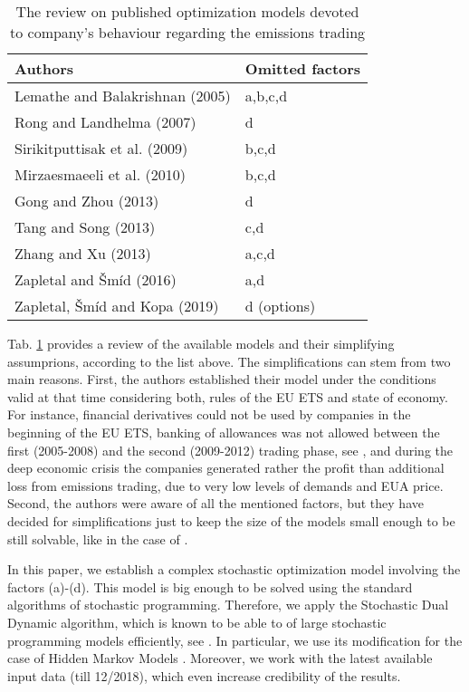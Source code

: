 \documentclass[3p,times]{elsarticle}
\begin{document}
\begin{table}[htbp]               
\centering
\begin{tabular}{l|l}\hline
Authors & Omitted factors\\ \hline
Lemathe and Balakrishnan (2005)& a,b,c,d\\
Rong and Landhelma (2007)& d\\
Sirikitputtisak et al. (2009)& b,c,d\\
Mirzaesmaeeli et al. (2010)& b,c,d\\
Gong and Zhou (2013) & d\\
Tang and Song (2013)& c,d\\
Zhang and Xu (2013)& a,c,d\\
Zapletal and \v Sm\' id (2016)& a,d \\
Zapletal, \v Sm\' id and Kopa (2019)& d (options)\\\hline

\end{tabular}
\caption{The review on published optimization models devoted to company's behaviour regarding the emissions trading}
\label{tab1}
\end{table}


Tab. \ref{tab1} provides a review of the available models and their simplifying assumprions, according to the list above. The simplifications can stem from two main reasons. First, the authors established their model under the conditions valid at that time considering both, rules of the EU ETS and state of economy. For instance, financial derivatives could not be used by companies in the beginning of the EU ETS, banking of allowances was not allowed between the first (2005-2008) and the second (2009-2012) trading phase, see \citet{zapletal3}, and during the deep economic crisis the companies generated rather the profit than additional loss from emissions trading, due to very low levels of demands and EUA price. Second, the authors were aware of all the mentioned factors, but they have decided for simplifications just to keep the size of the models small enough to be still solvable, like in the case of \citet{anor}.

In this paper, we establish a complex stochastic optimization model involving the factors (a)-(d). This model is big enough to be solved using the standard algorithms of stochastic programming. Therefore, we apply the Stochastic Dual Dynamic algorithm, which is known to be able to of large stochastic programming models efficiently, see \citet{pereira1991multi}. In particular, we use its modification for the case of Hidden Markov Models \citep{philpott2013solving}. Moreover, we work with the latest available input data (till 12/2018), which even increase credibility of the results. 
\end{document}
